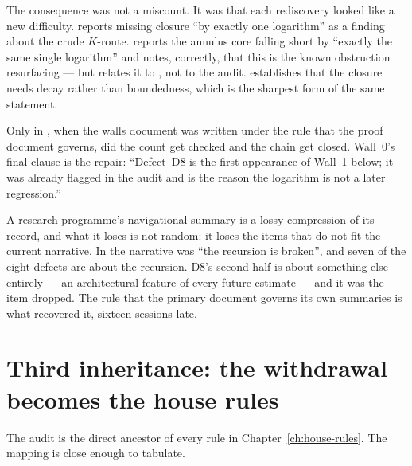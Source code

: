 The consequence was not a miscount. It was that each rediscovery looked like a
new difficulty.  reports missing closure ``by exactly one logarithm'' as
a finding about the crude \(K\)-route.  reports the annulus core falling
short by ``exactly the same single logarithm'' and notes, correctly, that this
is the known obstruction resurfacing --- but relates it to , not to the
audit.  establishes that the closure needs decay rather than
boundedness, which is the sharpest form of the same statement.

Only in , when the walls document was written under the rule that the
proof document governs, did the count get checked and the chain get closed.
Wall~0's final clause is the repair: ``Defect~D8 is the first appearance of
Wall~1 below; it was already flagged in the audit and is the reason the
logarithm is not a later regression.''

\begin{obsv}
\label{obs:summary-loss}
A research programme's navigational summary is a lossy compression of its
record, and what it loses is not random: it loses the items that do not fit
the current narrative. In  the narrative was ``the recursion is broken'',
and seven of the eight defects are about the recursion. D8's second half is
about something else entirely --- an architectural feature of every future
estimate --- and it was the item dropped. The rule that the primary document
governs its own summaries is what recovered it, sixteen sessions late.
\end{obsv}

\section{Third inheritance: the withdrawal becomes the house rules}
\label{sec:withdrawal-to-rules}

The  audit is the direct ancestor of every rule in
Chapter~\ref{ch:house-rules}. The mapping is close enough to tabulate.

